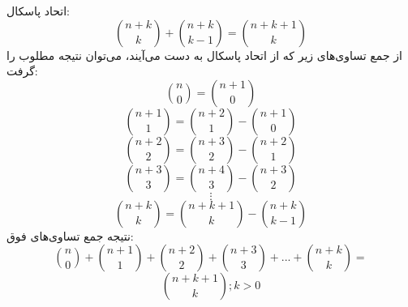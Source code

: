 \p
     اتحاد پاسکال:
     \[\binom{n+k}{k}+\binom{n+k}{k-1} = \binom{n+k+1}{k}\]
    از جمع تساوی‌های زیر که از اتحاد پاسکال به دست می‌آیند، می‌توان نتیجه مطلوب را گرفت:
    \[\binom{n}{0} = \binom{n+1}{0}\]
    \[\binom{n+1}{1} = \binom{n+2}{1}-\binom{n+1}{0}\]
    \[\binom{n+2}{2} = \binom{n+3}{2}-\binom{n+2}{1}\]
    \[\binom{n+3}{3} = \binom{n+4}{3}-\binom{n+3}{2}\]
    $$\vdots$$
    \[\binom{n+k}{k} = \binom{n+k+1}{k}-\binom{n+k}{k-1}\]
    نتیجه جمع تساوی‌های فوق:
    $$\binom{n}{0}+\binom{n+1}{1}+\binom{n+2}{2}+\binom{n+3}{3}+...+\binom{n+k}{k} =$$
     $$\binom{n+k+1}{k}; k>0$$